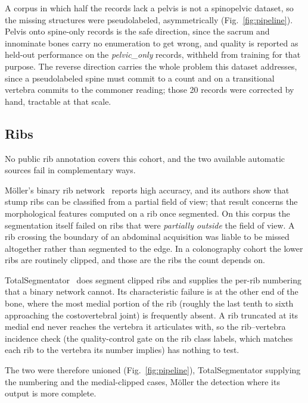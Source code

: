 \documentclass[aapm,mph,amsmath,amssymb,reprint]{revtex4-2}
\begin{document}
A corpus in which half the records lack a pelvis is not a spinopelvic dataset, so the
missing structures were pseudolabeled, asymmetrically (Fig.~\ref{fig:pipeline}). Pelvis
onto spine-only records is the safe direction, since the sacrum and innominate bones carry no
enumeration to get wrong, and quality is reported as held-out performance on the
\emph{pelvic\_only} records, withheld from training for that purpose. The reverse direction
carries the whole problem this dataset addresses, since a pseudolabeled spine must commit to
a count and on a transitional vertebra commits to the commoner reading; those 20 records were
corrected by hand, tractable at that scale.

\subsection{Ribs}

No public rib annotation covers this cohort, and the two available automatic sources fail
in complementary ways.

Möller's binary rib network~\cite{moller2026} reports high accuracy, and its authors show
that stump ribs can be classified from a partial field of view; that result concerns the
morphological features computed on a rib once segmented. On this corpus the segmentation
itself failed on ribs that were \emph{partially outside} the field of view. A rib crossing
the boundary of an abdominal acquisition was liable to be missed altogether rather than
segmented to the edge.  In a colonography cohort the lower ribs are routinely clipped, and
those are the ribs the count depends on.

TotalSegmentator~\cite{totalsegmentator} does segment clipped ribs and supplies the
per-rib numbering that a binary network cannot. Its characteristic failure is at the other end of the bone, where the most medial portion of the rib (roughly the last tenth to sixth
approaching the costovertebral joint) is frequently absent. A rib truncated at its
medial end never reaches the vertebra it articulates with, so the rib--vertebra incidence
check (the quality-control gate on the rib class labels, which matches each rib to the
vertebra its number implies) has nothing to test.

The two were therefore unioned (Fig.~\ref{fig:pipeline}), TotalSegmentator supplying the
numbering and the medial-clipped cases, Möller the detection where its output is more
complete.
\end{document}

